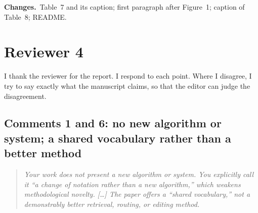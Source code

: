 \documentclass[11pt]{article}
\newenvironment{reviewer}{\par\medskip\noindent\begin{quote}\itshape}{\end{quote}}
\newcommand{\changes}{\par\smallskip\noindent\textbf{Changes.}\ }
\begin{document}
\changes Table~7 and its caption; first paragraph after Figure~1; caption of Table~8; README.

\section*{Reviewer 4}

I thank the reviewer for the report. I respond to each point. Where I disagree, I try to say exactly what the manuscript claims, so that the editor can judge the disagreement.

\subsection*{Comments 1 and 6: no new algorithm or system; a shared vocabulary rather than a better method}

\begin{reviewer}
Your work does not present a new algorithm or system. You explicitly call it ``a change of notation rather than a new algorithm,'' which weakens methodological novelty. [\dots] The paper offers a ``shared vocabulary,'' not a demonstrably better retrieval, routing, or editing method.
\end{reviewer}
\end{document}
